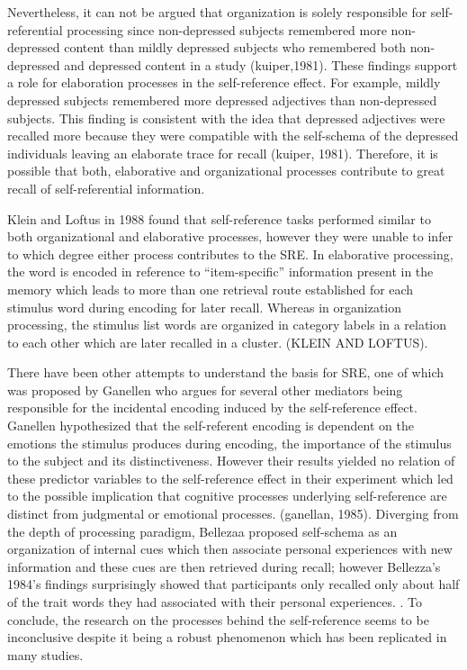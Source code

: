 \documentclass[
  man,floatsintext]{apa6}
\begin{document}
Nevertheless, it can not be argued that organization is solely responsible for self-referential processing since non-depressed subjects remembered more non-depressed content than mildly depressed subjects who remembered both non-depressed and depressed content in a study (kuiper,1981). These findings support a role for elaboration processes in the self-reference effect. For example, mildly depressed subjects remembered more depressed adjectives than non-depressed subjects. This finding is consistent with the idea that depressed adjectives were recalled more because they were compatible with the self-schema of the depressed individuals leaving an elaborate trace for recall (kuiper, 1981). Therefore, it is possible that both, elaborative and organizational processes contribute to great recall of self-referential information.

Klein and Loftus in 1988 found that self-reference tasks performed similar to both organizational and elaborative processes, however they were unable to infer to which degree either process contributes to the SRE. In elaborative processing, the word is encoded in reference to ``item-specific'' information present in the memory which leads to more than one retrieval route established for each stimulus word during encoding for later recall. Whereas in organization processing, the stimulus list words are organized in category labels in a relation to each other which are later recalled in a cluster. (KLEIN AND LOFTUS).

There have been other attempts to understand the basis for SRE, one of which was proposed by Ganellen who argues for several other mediators being responsible for the incidental encoding induced by the self-reference effect. Ganellen hypothesized that the self-referent encoding is dependent on the emotions the stimulus produces during encoding, the importance of the stimulus to the subject and its distinctiveness. However their results yielded no relation of these predictor variables to the self-reference effect in their experiment which led to the possible implication that cognitive processes underlying self-reference are distinct from judgmental or emotional processes. (ganellan, 1985). Diverging from the depth of processing paradigm, Bellezaa proposed self-schema as an organization of internal cues which then associate personal experiences with new information and these cues are then retrieved during recall; however Bellezza's 1984's findings surprisingly showed that participants only recalled only about half of the trait words they had associated with their personal experiences. . To conclude, the research on the processes behind the self-reference seems to be inconclusive despite it being a robust phenomenon which has been replicated in many studies.
\end{document}
